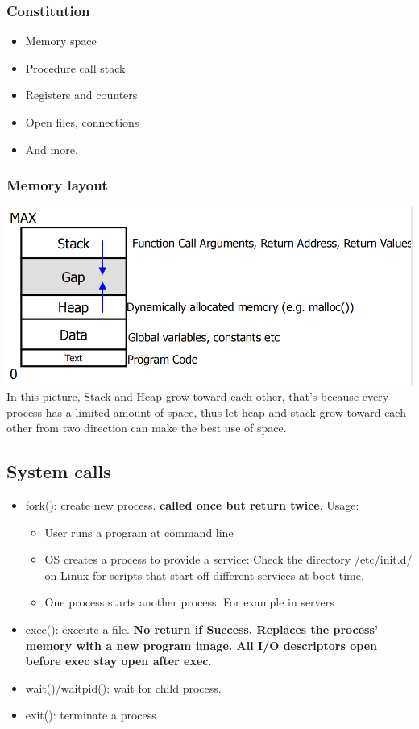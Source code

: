 \documentclass[12pt]{article}
\begin{document}
\subsubsection{Constitution}
\begin{itemize}
    \item Memory space
    \item Procedure call stack
    \item Registers and counters
    \item Open files, connections
    \item And more.
\end{itemize}

\subsubsection{Memory layout}
\includegraphics[width=1.0\textwidth]{ProcessMemoryLayout.png}
In this picture, Stack and Heap grow toward each other, that's because every process has a limited amount of space, thus let heap and stack grow toward each other from two direction can make the best use of space.

\subsection{System calls}
\begin{itemize}
    \item fork(): create new process. {\bfseries called once but return twice}. Usage: \begin{itemize}
        \item User runs a program at command line
        \item OS creates a process to provide a service: Check the directory /etc/init.d/ on Linux for scripts that start off different services at boot time.
        \item One process starts another process: For example in servers
    \end{itemize}
    \item exec(): execute a file. {\bfseries No return if Success. Replaces the process’ memory with a new program image. All I/O descriptors open before exec stay open after exec}.
    \item wait()/waitpid(): wait for child process.
    \item exit(): terminate a process
\end{itemize}
\end{document}
